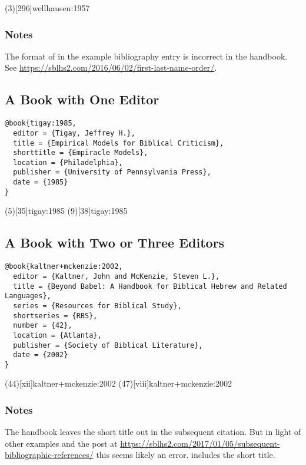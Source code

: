 \documentclass[a4paper]{article}
\begin{document}
\examplecite(3)[296]{wellhausen:1957}
\examplebibliography

\subsubsection{Notes}

The format of  in the example bibliography
entry is incorrect in the handbook. See
\url{https://sblhs2.com/2016/06/02/first-last-name-order/}.

\subsection{A Book with One Editor}

\begin{verbatim}
@book{tigay:1985,
  editor = {Tigay, Jeffrey H.},
  title = {Empirical Models for Biblical Criticism},
  shorttitle = {Empiracle Models},
  location = {Philadelphia},
  publisher = {University of Pennsylvania Press},
  date = {1985}
}
\end{verbatim}

\examplecite(5)[35]{tigay:1985}
\examplecite(9)[38]{tigay:1985}
\examplebibliography

\subsection{A Book with Two or Three Editors}

\begin{verbatim}
@book{kaltner+mckenzie:2002,
  editor = {Kaltner, John and McKenzie, Steven L.},
  title = {Beyond Babel: A Handbook for Biblical Hebrew and Related Languages},
  series = {Resources for Biblical Study},
  shortseries = {RBS},
  number = {42},
  location = {Atlanta},
  publisher = {Society of Biblical Literature},
  date = {2002}
}
\end{verbatim}

\examplecite(44)[xii]{kaltner+mckenzie:2002}
\examplecite(47)[viii]{kaltner+mckenzie:2002}
\exampleabbreviations
\examplebibliography

\subsubsection{Notes}

The handbook leaves the short title out in the subsequent citation. But in
light of other examples and the post at
\url{https://sblhs2.com/2017/01/05/subsequent-bibliographic-references/} this
seems likely an error.  includes the short title.
\end{document}
